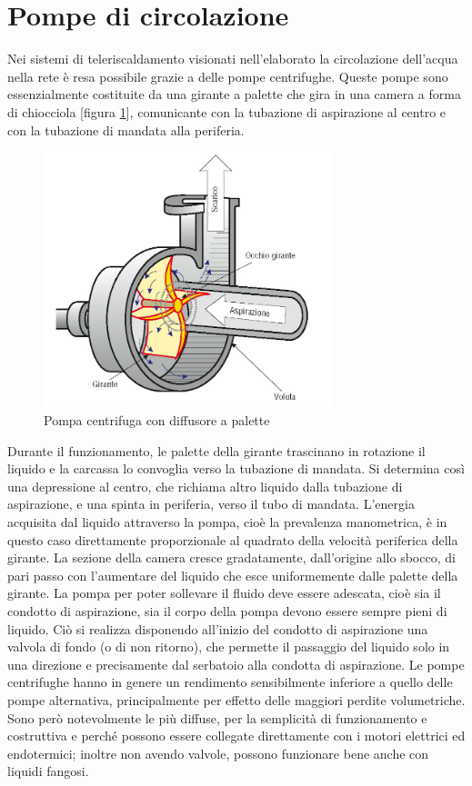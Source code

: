 \documentclass[laurea,oneside,11pt]{USiena_tesiLM}
\begin{document}
\section{Pompe di circolazione}
Nei sistemi di teleriscaldamento visionati nell'elaborato la circolazione dell'acqua nella rete è resa possibile grazie a delle pompe centrifughe. Queste pompe sono essenzialmente costituite da una girante a palette che gira in una camera a forma di chiocciola [figura \ref{fig:pompa_centrifuga}], comunicante con la tubazione di aspirazione al centro e con la tubazione di mandata alla periferia.

\begin{figure}[h]
\centering
\includegraphics[width=0.75\textwidth]{figure/pompa_centrifuga} 
\caption{Pompa centrifuga con diffusore a palette}
\label{fig:pompa_centrifuga}
\end{figure}

Durante il funzionamento, le palette della girante trascinano in rotazione il liquido e la carcassa lo convoglia verso la tubazione di mandata.
Si determina così una depressione al centro, che richiama altro liquido dalla tubazione di aspirazione, e una spinta in periferia, verso il tubo di mandata.
L'energia acquisita dal liquido attraverso la pompa, cioè la prevalenza manometrica, è in questo caso direttamente proporzionale al quadrato della velocità periferica della girante.
La sezione della camera cresce gradatamente, dall'origine allo sbocco, di pari passo con l'aumentare del liquido che esce uniformemente dalle palette della girante.
La pompa per poter sollevare il fluido deve
essere adescata, cioè sia il condotto di
aspirazione, sia il corpo della pompa devono essere sempre pieni di liquido. Ciò si realizza disponendo all'inizio del condotto di aspirazione una valvola di fondo (o di non ritorno), che permette il passaggio del liquido solo in una direzione e precisamente dal serbatoio alla condotta di aspirazione.
Le pompe centrifughe hanno in genere un rendimento sensibilmente inferiore a quello delle pompe alternativa, principalmente per effetto delle maggiori perdite volumetriche. Sono però notevolmente le più diffuse, per la semplicità di funzionamento e costruttiva e perché possono essere collegate direttamente con i motori elettrici ed endotermici; inoltre non avendo valvole, possono funzionare bene anche con liquidi fangosi.
\end{document}
